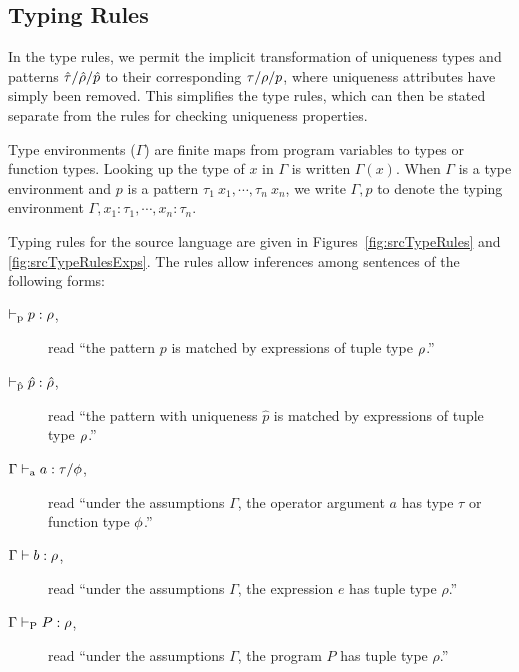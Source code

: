 \subsection{Typing Rules}

In the type rules, we permit the implicit transformation of uniqueness
types and patterns $\hat{\tau}/\hat{\rho}/\hat{p}$ to their corresponding
$\tau/\rho/p$, where uniqueness attributes have simply been removed.
This simplifies the type rules, which can then be stated separate from
the rules for checking uniqueness properties.

Type environments ($\Gamma$) are finite maps from program variables to
types or function types.  Looking up the type of $x$ in $\Gamma$ is
written $\Gamma(x)$.  When $\Gamma$ is a type environment and $p$ is a
pattern $\tau_1~x_1,\cdots,\tau_n~x_n$, we write $\Gamma,p$ to denote
the typing environment $\Gamma,x_1:\tau_1,\cdots,x_n:\tau_n$.

Typing rules for the source language are given in
Figures~\ref{fig:srcTypeRules} and \ref{fig:srcTypeRulesExps}.  The
rules allow inferences among sentences of the following forms:

\begin{description}
\item[$\vdash_\textrm{p} p : \rho$,] read ``the pattern $p$ is matched by
  expressions of tuple type $\rho$.''
\item[$\vdash_{\hat{\textrm{p}}} \hat{p} : \hat{\rho}$,] read ``the pattern with uniqueness
  $\hat{p}$ is matched by expressions of tuple type $\rho$.''
\item[$\Gamma \vdash_\textrm{a} a : \tau / \phi$,] read ``under the assumptions
$\Gamma$, the operator argument $a$ has type $\tau$ or function type
$\phi$.''
\item[$\Gamma \vdash b : \rho$,] read ``under the assumptions $\Gamma$,
  the expression $e$ has tuple type $\rho$.''
\item[$\Gamma \vdash_\textrm{P} P : \rho$,] read ``under the assumptions
$\Gamma$, the program $P$ has tuple type $\rho$.''
\end{description}

